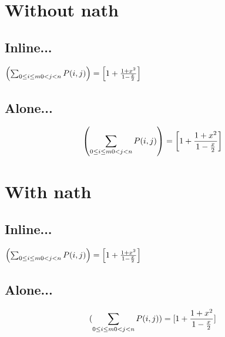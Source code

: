 \documentclass[10pt,a4paper]{article}
\begin{document}
\section{Without nath}

\subsection{Inline...}

$	\left( \sum_{0 \le i \le m \\ 0 < j < n} P(i,j) \right) = \left[ 1 + \frac{1 + x^2}{1 - \frac{x}{2}} \right]$


\subsection{Alone...}

\begin{equation}
	\left( \sum_{0 \le i \le m \\ 0 < j < n} P(i,j) \right)
	= \left[ 1 + \frac{1 + x^2}{1 - \frac{x}{2}} \right]
\end{equation}


\section{With nath}

\makeatletter
	
\makeatother

\subsection{Inline...}

$	\left( \sum_{0 \le i \le m \\ 0 < j < n} P(i,j) \right) = \left[ 1 + \frac{1 + x^2}{1 - \frac{x}{2}} \right]$


\subsection{Alone...}

\begin{equation}
	( \sum_{0 \le i \le m \\ 0 < j < n} P(i,j) )
	= [ 1 + \frac{1 + x^2}{1 - \frac{x}{2}} ]
\end{equation}
\end{document}
